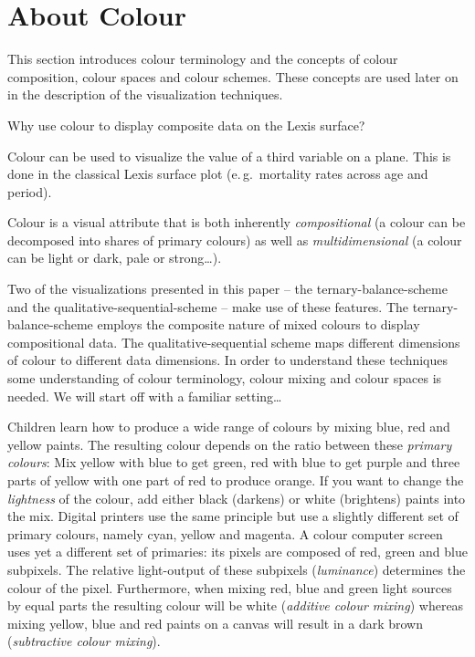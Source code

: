 \documentclass[a4paper, 12pt]{scrartcl}
\begin{document}
\clearpage

\section{About Colour} %
\label{sec:colour}

This section introduces colour terminology and the concepts of colour composition, colour spaces and colour schemes. These concepts are used later on in the description of the visualization techniques.

Why use colour to display composite data on the Lexis surface?

\begin{compactenum}
  \item Colour can be used to visualize the value of a third variable on a plane. This is done in the classical Lexis surface plot (e.\,g.~mortality rates across age and period).
  \item Colour is a visual attribute that is both inherently \emph{compositional} (a colour can be decomposed into shares of primary colours) as well as \emph{multidimensional} (a colour can be light or dark, pale or strong\ldots).
\end{compactenum}

Two of the visualizations presented in this paper -- the ternary-balance-scheme and the qualitative-sequential-scheme -- make use of these features. The ternary-balance-scheme employs the composite nature of mixed colours to display compositional data. The qualitative-sequential scheme maps different dimensions of colour to different data dimensions. In order to understand these techniques some understanding of colour terminology, colour mixing and colour spaces is needed. We will start off with a familiar setting\ldots

Children learn how to produce a wide range of colours by mixing blue, red and yellow paints. The resulting colour depends on the ratio between these \emph{primary colours}: Mix yellow with blue to get green, red with blue to get purple and three parts of yellow with one part of red to produce orange. If you want to change the \emph{lightness} of the colour, add either black (darkens) or white (brightens) paints into the mix. Digital printers use the same principle but use a slightly different set of primary colours, namely cyan, yellow and magenta. A colour computer screen uses yet a different set of primaries: its pixels are composed of red, green and blue subpixels. The relative light-output of these subpixels (\emph{luminance}) determines the colour of the pixel. Furthermore, when mixing red, blue and green light sources by equal parts the resulting colour will be white (\emph{additive colour mixing}) whereas mixing yellow, blue and red paints on a canvas will result in a dark brown (\emph{subtractive colour mixing}).
\end{document}
